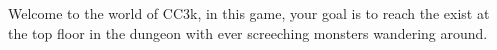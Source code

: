 \documentclass[11pt]{article}
\begin{document}
Welcome to the world of CC3k, in this game, your goal is to reach the exist at the top floor in the dungeon
with ever screeching monsters wandering around.
\end{document}
